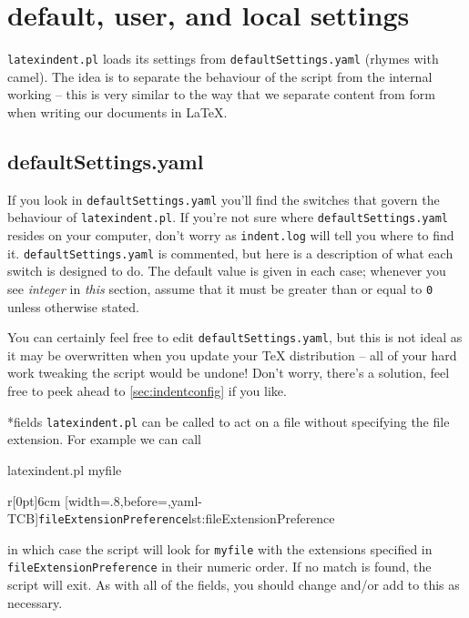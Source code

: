 \section{default, user, and local settings}\label{sec:defuseloc}
\texttt{latexindent.pl} loads its settings from \texttt{defaultSettings.yaml}
(rhymes with camel). The idea is to separate the behaviour of the script
from the internal working -- this is very similar to the way that we separate content
from form when writing our documents in \LaTeX.

\subsection{defaultSettings.yaml}
If you look in \texttt{defaultSettings.yaml} you'll find the switches
that govern the behaviour of \texttt{latexindent.pl}. If you're not sure where
\texttt{defaultSettings.yaml} resides on your computer, don't worry as \texttt{indent.log}
will tell you where to find it.
\texttt{defaultSettings.yaml} is commented,
but here is a description of what each switch is designed to do. The default
value is given in each case; whenever you see \emph{integer} in \emph{this}
section, assume that it must be greater than or equal to \texttt{0} unless
otherwise stated.

You can certainly feel free to edit \texttt{defaultSettings.yaml}, but
this is not ideal as it may be overwritten when you update your \TeX{} distribution --
all of your hard work tweaking the script would be undone! Don't worry,
there's a solution, feel free to peek ahead to \cref{sec:indentconfig} if you like.

*{fields}
\texttt{latexindent.pl} can be called to
act on a file without
specifying the file extension.  For example we can call 
\begin{commandshell}
latexindent.pl myfile
\end{commandshell}
\begin{wrapfigure}[8]{r}[0pt]{6cm}
[width=.8\linewidth,before=\centering,yaml-TCB]{\texttt{fileExtensionPreference}}{lst:fileExtensionPreference}
\end{wrapfigure}

in which case the script will look for \texttt{myfile} with the extensions
specified in \texttt{fileExtensionPreference} in their numeric order. If
no match is found, the script will exit. As with all of the fields, you should
change and/or add to this as necessary.

